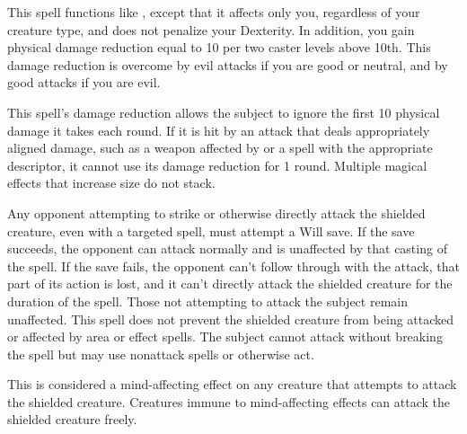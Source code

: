 \begin{spelleffect}
  This spell functions like , except that it affects only you, regardless of your creature type, and does not penalize your Dexterity. In addition, you gain physical damage reduction equal to 10  per two caster levels above 10th. This damage reduction is overcome by evil attacks if you are good or neutral, and by good attacks if you are evil.
\end{spelleffect}
\begin{spellnotes}
  This spell's damage reduction allows the subject to ignore the first 10 physical damage it takes each round. If it is hit by an attack that deals appropriately aligned damage, such as a weapon affected by  or a spell with the appropriate descriptor, it cannot use its damage reduction for 1 round.
  Multiple magical effects that increase size do not stack.
\end{spellnotes}

\spelldur{\durshort}
\begin{spelleffect}
  Any opponent attempting to strike or otherwise directly attack the shielded creature, even with a targeted spell, must attempt a Will save. If the save succeeds, the opponent can attack normally and is unaffected by that casting of the spell. If the save fails, the opponent can't follow through with the attack, that part of its action is lost, and it can't directly attack the shielded creature for the duration of the spell. Those not attempting to attack the subject remain unaffected. This spell does not prevent the shielded creature from being attacked or affected by area or effect spells. The subject cannot attack without breaking the spell but may use nonattack spells or otherwise act.
\end{spelleffect}
\begin{spellnotes}
    This is considered a mind-affecting effect on any creature that attempts to attack the shielded creature. Creatures immune to mind-affecting effects can attack the shielded creature freely.
\end{spellnotes}


